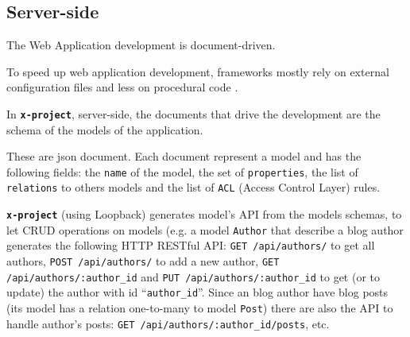 \documentclass{sig-alternate}
\newcommand{\brand}[1]{\textbf{\tt #1}}
\begin{document}

 



\subsection{Server-side}
The Web Application development is document-driven.

To speed up web application development, frameworks mostly rely on external configuration files and less on procedural code \cite{6859693}.


In \brand{x-project}, server-side, the documents that drive the development are the schema of the models of the application.


These are json document. Each document represent a model and has the following fields: the \texttt{name} of the model, the set of \texttt{properties}, the list of \texttt{relations} to others models and the list of \texttt{ACL} (Access Control Layer) rules. 

\brand{x-project} (using Loopback) generates model’s API from the models schemas, to let CRUD operations on models (e.g. a model \texttt{Author} that describe a blog author generates the following HTTP RESTful API: \texttt{GET /api/authors/} to get all authors, \texttt{POST /api/authors/} to add a new author, \texttt{GET /api/authors/:author\_id} and \texttt{PUT /api/authors/:author\_id} to get (or to update) the author with id ``\texttt{author\_id}''. 
Since an blog author have blog posts (its model has a relation one-to-many to model \texttt{Post}) there are also the API to handle author's posts: \texttt{GET /api/authors/:author\_id/posts}, etc.
\end{document}

